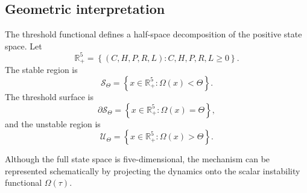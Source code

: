 \documentclass[11pt]{article}
\begin{document}
\subsection{Geometric interpretation}

The threshold functional defines a half-space decomposition of the positive state space. Let
\[
\mathbb{R}_{+}^{5}
=
\left\{
(C,H,P,R,L): C,H,P,R,L\geq 0
\right\}.
\]
The stable region is
\begin{equation}
\label{eq:stable-set}
\mathcal{S}_{\Theta}
=
\left\{
x\in\mathbb{R}_{+}^{5}:
\Omega(x)<\Theta
\right\}.
\end{equation}
The threshold surface is
\begin{equation}
\label{eq:threshold-surface}
\partial\mathcal{S}_{\Theta}
=
\left\{
x\in\mathbb{R}_{+}^{5}:
\Omega(x)=\Theta
\right\},
\end{equation}
and the unstable region is
\begin{equation}
\label{eq:unstable-set}
\mathcal{U}_{\Theta}
=
\left\{
x\in\mathbb{R}_{+}^{5}:
\Omega(x)>\Theta
\right\}.
\end{equation}

Although the full state space is five-dimensional, the mechanism can be represented schematically by projecting the dynamics onto the scalar instability functional $\Omega(\tau)$.
\end{document}
